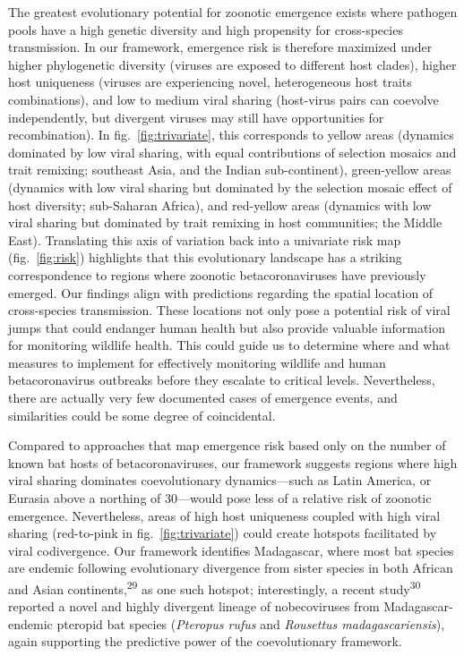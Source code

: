 \documentclass[10pt,oneside]{article}
\begin{document}
The greatest evolutionary potential for zoonotic emergence exists where
pathogen pools have a high genetic diversity and high propensity for
cross-species transmission. In our framework, emergence risk is
therefore maximized under higher phylogenetic diversity (viruses are
exposed to different host clades), higher host uniqueness (viruses are
experiencing novel, heterogeneous host traits combinations), and low to
medium viral sharing (host-virus pairs can coevolve independently, but
divergent viruses may still have opportunities for recombination). In
fig.~\ref{fig:trivariate}, this corresponds to yellow areas (dynamics
dominated by low viral sharing, with equal contributions of selection
mosaics and trait remixing; southeast Asia, and the Indian
sub-continent), green-yellow areas (dynamics with low viral sharing but
dominated by the selection mosaic effect of host diversity; sub-Saharan
Africa), and red-yellow areas (dynamics with low viral sharing but
dominated by trait remixing in host communities; the Middle East).
Translating this axis of variation back into a univariate risk map
(fig.~\ref{fig:risk}) highlights that this evolutionary landscape has a
striking correspondence to regions where zoonotic betacoronaviruses have
previously emerged. Our findings align with predictions regarding the
spatial location of cross-species transmission. These locations not only
pose a potential risk of viral jumps that could endanger human health
but also provide valuable information for monitoring wildlife health.
This could guide us to determine where and what measures to implement
for effectively monitoring wildlife and human betacoronavirus outbreaks
before they escalate to critical levels. Nevertheless, there are
actually very few documented cases of emergence events, and similarities
could be some degree of coincidental.

Compared to approaches that map emergence risk based only on the number
of known bat hosts of betacoronaviruses, our framework suggests regions
where high viral sharing dominates coevolutionary dynamics---such as
Latin America, or Eurasia above a northing of 30---would pose less of a
relative risk of zoonotic emergence. Nevertheless, areas of high host
uniqueness coupled with high viral sharing (red-to-pink in
fig.~\ref{fig:trivariate}) could create hotspots facilitated by viral
codivergence. Our framework identifies Madagascar, where most bat
species are endemic following evolutionary divergence from sister
species in both African and Asian continents,\textsuperscript{29} as one
such hotspot; interestingly, a recent study\textsuperscript{30} reported
a novel and highly divergent lineage of nobecoviruses from
Madagascar-endemic pteropid bat species (\emph{Pteropus rufus} and
\emph{Rousettus madagascariensis}), again supporting the predictive
power of the coevolutionary framework.
\end{document}
